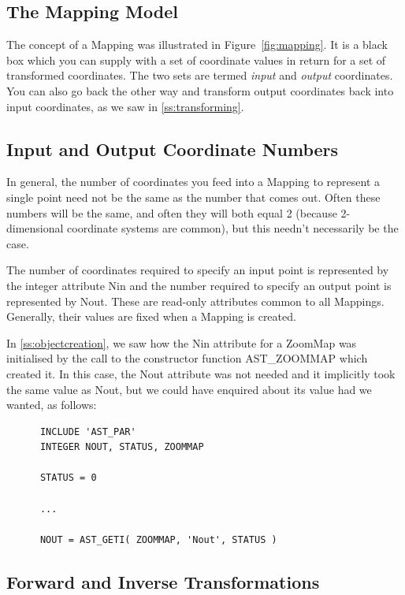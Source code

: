 \documentclass[twoside,11pt]{article}
\newcommand{\htmlref}[2]{#1}
\newcommand{\secref}[1]{\S\ref{#1}}
\renewcommand{\secref}[1]{\ref{#1}}
\begin{document}
\subsection{The Mapping Model}

The concept of a \htmlref{Mapping}{Mapping} was illustrated in Figure~\ref{fig:mapping}.
It is a black box which you can supply with a set of coordinate values
in return for a set of transformed coordinates. The two sets are
termed {\em{input}} and {\em{output}} coordinates. You can also go
back the other way and transform output coordinates back into input
coordinates, as we saw in \secref{ss:transforming}.

\subsection{Input and Output Coordinate Numbers}

In general, the number of coordinates you feed into a \htmlref{Mapping}{Mapping} to
represent a single point need not be the same as the number that comes
out. Often these numbers will be the same, and often they will both
equal 2 (because 2-dimensional coordinate systems are common), but
this needn't necessarily be the case.

The number of coordinates required to specify an input point is
represented by the integer attribute \htmlref{Nin}{Nin} and the number required to
specify an output point is represented by \htmlref{Nout}{Nout}. These are read-only
attributes common to all Mappings. Generally, their values are fixed
when a Mapping is created.

In \secref{ss:objectcreation}, we saw how the Nin attribute for a
\htmlref{ZoomMap}{ZoomMap} was initialised by the call to the constructor function
\htmlref{AST\_ZOOMMAP}{AST_ZOOMMAP} which created it. In this case, the Nout attribute was
not needed and it implicitly took the same value as Nout, but we could
have enquired about its value had we wanted, as follows:

\small
\begin{verbatim}
      INCLUDE 'AST_PAR'
      INTEGER NOUT, STATUS, ZOOMMAP

      STATUS = 0

      ...

      NOUT = AST_GETI( ZOOMMAP, 'Nout', STATUS )
\end{verbatim}
\normalsize

\subsection{Forward and Inverse Transformations}
\end{document}
